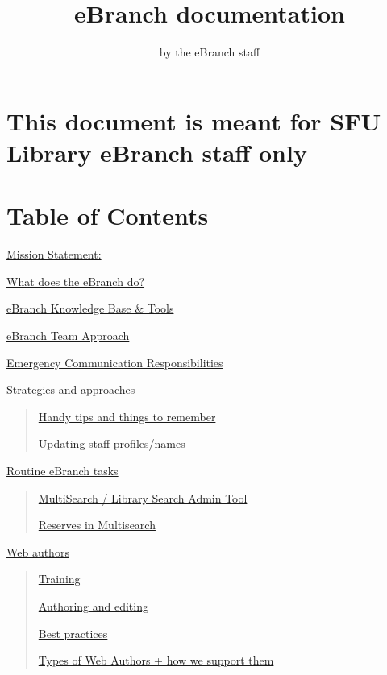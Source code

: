 \documentclass[
  openany]{book}
\title{eBranch documentation}
\author{by the eBranch staff}
\date{}
\begin{document}
\maketitle

{
\setcounter{tocdepth}{1}
\tableofcontents
}
\hypertarget{this-document-is-meant-for-sfu-library-ebranch-staff-only}{%
\chapter{This document is meant for SFU Library eBranch staff only}\label{this-document-is-meant-for-sfu-library-ebranch-staff-only}}

\hypertarget{table-of-contents}{%
\chapter{Table of Contents}\label{table-of-contents}}

\protect\hyperlink{mission-statement}{Mission Statement:}

\protect\hyperlink{what-does-the-ebranch-do}{What does the eBranch do?}

\protect\hyperlink{ebranch-knowledge-base-tools}{eBranch Knowledge Base \& Tools}

\protect\hyperlink{ebranch-team-approach}{eBranch Team Approach}

\protect\hyperlink{emergency-communication-responsibilities}{Emergency Communication
Responsibilities}

\protect\hyperlink{strategies-and-approaches}{Strategies and approaches}

\begin{quote}
\protect\hyperlink{handy-tips-and-things-to-remember}{Handy tips and things to
remember}

\protect\hyperlink{updating-staff-profilesnames}{Updating staff profiles/names}
\end{quote}

\protect\hyperlink{routine-ebranch-tasks}{Routine eBranch tasks}

\begin{quote}
\protect\hyperlink{multisearch-library-search-admin-tool}{MultiSearch / Library Search Admin
Tool}

\protect\hyperlink{reserves-in-multisearch}{Reserves in Multisearch}
\end{quote}

\protect\hyperlink{web-authors}{Web authors}

\begin{quote}
\protect\hyperlink{training}{Training}

\protect\hyperlink{authoring-and-editing}{Authoring and editing}

\protect\hyperlink{best-practices}{Best practices}

\protect\hyperlink{types-of-web-authors-how-we-support-them}{Types of Web Authors + how we support
them}
\end{quote}
\end{document}
